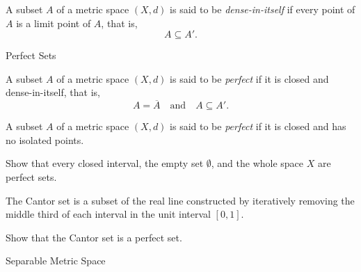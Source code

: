 \documentclass[12pt, a4paper]{article}
\begin{document}
\vspace{10pt}

\begin{definition}
A subset $A$ of a metric space $(X,d)$ is said to be \emph{dense-in-itself} if every point of
$A$ is a limit point of $A$, that is,
\[
A\subseteq A'.
\]
\end{definition}

\clearpage

\begin{heading}
    Perfect Sets
\end{heading}

\vspace{10pt}

\begin{definition}
A subset $A$ of a metric space $(X,d)$ is said to be \emph{perfect} if it is closed and dense-in-itself, that is,
\[A=\overline{A}\quad\text{and}\quad A\subseteq A'.\]
\end{definition}

\vspace{10pt}

\begin{definition}
A subset $A$ of a metric space $(X,d)$ is said to be \emph{perfect} if it is closed and has no isolated points.
\end{definition}

\vspace{10pt}

\begin{problem}
Show that every closed interval, the empty set $\emptyset$, and the whole space $X$ are
perfect sets.
\end{problem}

\clearpage

\begin{definition}
The Cantor set is a subset of the real line constructed by iteratively removing the middle third of each interval in the unit interval $[0,1]$.
\end{definition}

\clearpage

\begin{problem}
Show that the Cantor set is a perfect set.
\end{problem}

\clearpage

\begin{heading}
    Separable Metric Space
\end{heading}
\end{document}
